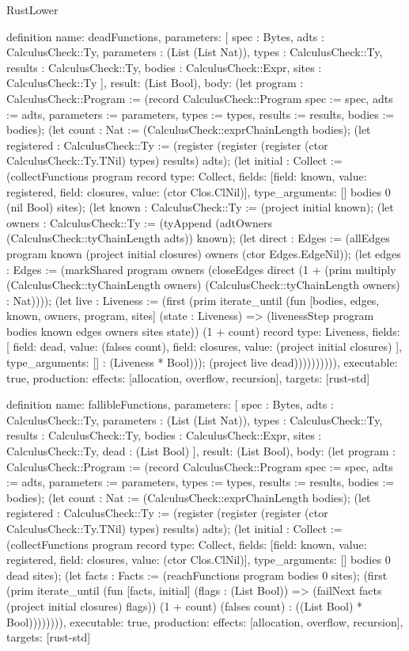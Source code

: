 \begin{lexlean}{RustLower}
\begin{semanticmodule}
definition{
  name: deadFunctions,
  parameters: [
    spec : Bytes,
    adts : CalculusCheck::Ty,
    parameters : (List (List Nat)),
    types : CalculusCheck::Ty,
    results : CalculusCheck::Ty,
    bodies : CalculusCheck::Expr,
    sites : CalculusCheck::Ty
  ],
  result: (List Bool),
  body: (let program : CalculusCheck::Program := (record CalculusCheck::Program {spec := spec, adts := adts, parameters := parameters, types := types, results := results, bodies := bodies}); (let count : Nat := (CalculusCheck::exprChainLength bodies); (let registered : CalculusCheck::Ty := (register (register (register (ctor CalculusCheck::Ty.TNil) types) results) adts); (let initial : Collect := (collectFunctions program record{
    type: Collect,
    fields: [{field: known, value: registered}, {field: closures, value: (ctor Clos.ClNil)}],
    type_arguments: []
  } bodies 0 (nil Bool) sites); (let known : CalculusCheck::Ty := (project initial known); (let owners : CalculusCheck::Ty := (tyAppend (adtOwners (CalculusCheck::tyChainLength adts)) known); (let direct : Edges := (allEdges program known (project initial closures) owners (ctor Edges.EdgeNil)); (let edges : Edges := (markShared program owners (closeEdges direct (1 + (prim multiply (CalculusCheck::tyChainLength owners) (CalculusCheck::tyChainLength owners) : Nat)))); (let live : Liveness := (first (prim iterate_until (fun [bodies, edges, known, owners, program, sites] (state : Liveness) => (livenessStep program bodies known edges owners sites state)) (1 + count) record{
    type: Liveness,
    fields: [
      {field: dead, value: (falses count)},
      {field: closures, value: (project initial closures)}
    ],
    type_arguments: []
  } : (Liveness * Bool))); (project live dead)))))))))),
  executable: true,
  production: {effects: [allocation, overflow, recursion], targets: [rust-std]}
}

definition{
  name: fallibleFunctions,
  parameters: [
    spec : Bytes,
    adts : CalculusCheck::Ty,
    parameters : (List (List Nat)),
    types : CalculusCheck::Ty,
    results : CalculusCheck::Ty,
    bodies : CalculusCheck::Expr,
    sites : CalculusCheck::Ty,
    dead : (List Bool)
  ],
  result: (List Bool),
  body: (let program : CalculusCheck::Program := (record CalculusCheck::Program {spec := spec, adts := adts, parameters := parameters, types := types, results := results, bodies := bodies}); (let count : Nat := (CalculusCheck::exprChainLength bodies); (let registered : CalculusCheck::Ty := (register (register (register (ctor CalculusCheck::Ty.TNil) types) results) adts); (let initial : Collect := (collectFunctions program record{
    type: Collect,
    fields: [{field: known, value: registered}, {field: closures, value: (ctor Clos.ClNil)}],
    type_arguments: []
  } bodies 0 dead sites); (let facts : Facts := (reachFunctions program bodies 0 sites); (first (prim iterate_until (fun [facts, initial] (flags : (List Bool)) => (failNext facts (project initial closures) flags)) (1 + count) (falses count) : ((List Bool) * Bool)))))))),
  executable: true,
  production: {effects: [allocation, overflow, recursion], targets: [rust-std]}
}


\end{semanticmodule}
\end{lexlean}
